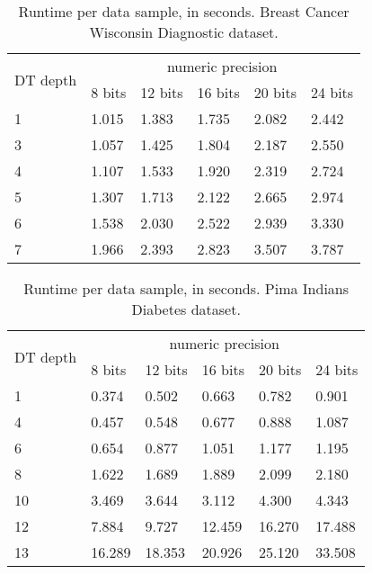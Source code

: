 \begin{table}[H]
\centering
\caption{Runtime per data sample, in seconds. Breast Cancer Wisconsin Diagnostic dataset.}
\label{table:runtimeDTBCW}
\begin{tabular}{|l|l|l|l|l|l|}
\hline
\multirow{2}{*}{DT depth} & \multicolumn{5}{c|}{numeric precision}         \\ \cline{2-6} 
                          & 8 bits & 12 bits & 16 bits & 20 bits & 24 bits \\ \hline
1                         & 1.015  & 1.383   & 1.735   & 2.082   & 2.442   \\ \hline
3                         & 1.057  & 1.425   & 1.804   & 2.187   & 2.550   \\ \hline
4                         & 1.107  & 1.533   & 1.920   & 2.319   & 2.724   \\ \hline
5                         & 1.307  & 1.713   & 2.122   & 2.665   & 2.974   \\ \hline
6                         & 1.538  & 2.030   & 2.522   & 2.939   & 3.330   \\ \hline
7                         & 1.966  & 2.393   & 2.823   & 3.507   & 3.787   \\ \hline
\end{tabular}
\end{table}


\begin{table}[H]
\centering
\caption{Runtime per data sample, in seconds. Pima Indians Diabetes dataset.}
\label{table:runtimeDTPID}
\begin{tabular}{|l|l|l|l|l|l|}
\hline
\multirow{2}{*}{DT depth} & \multicolumn{5}{c|}{numeric precision}         \\ \cline{2-6} 
                          & 8 bits & 12 bits & 16 bits & 20 bits & 24 bits \\ \hline
1                         & 0.374  & 0.502   & 0.663   & 0.782   & 0.901   \\ \hline
4                         & 0.457  & 0.548   & 0.677   & 0.888   & 1.087   \\ \hline
6                         & 0.654  & 0.877   & 1.051   & 1.177   & 1.195   \\ \hline
8                         & 1.622  & 1.689   & 1.889   & 2.099   & 2.180   \\ \hline
10                        & 3.469  & 3.644   & 3.112   & 4.300   & 4.343   \\ \hline
12                        & 7.884  & 9.727   & 12.459  & 16.270  & 17.488  \\ \hline
13                        & 16.289 & 18.353  & 20.926  & 25.120  & 33.508  \\ \hline
\end{tabular}
\end{table}

